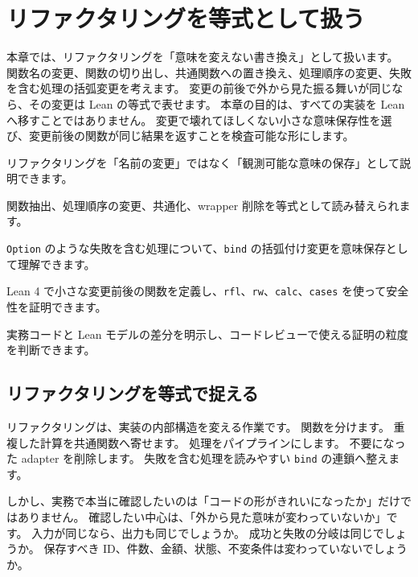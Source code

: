 \chapter{リファクタリングを等式として扱う}
\label{chap:ch34-refactoring-as-equations}

\begin{chapterabstract}
本章では、リファクタリングを「意味を変えない書き換え」として扱います。
関数名の変更、関数の切り出し、共通関数への置き換え、処理順序の変更、失敗を含む処理の括弧変更を考えます。
変更の前後で外から見た振る舞いが同じなら、その変更は Lean の等式で表せます。
本章の目的は、すべての実装を Lean へ移すことではありません。
変更で壊れてほしくない小さな意味保存性を選び、変更前後の関数が同じ結果を返すことを検査可能な形にします。
\end{chapterabstract}

\begin{learninggoals}
\item リファクタリングを「名前の変更」ではなく「観測可能な意味の保存」として説明できます。
\item 関数抽出、処理順序の変更、共通化、wrapper 削除を等式として読み替えられます。
\item \texttt{Option} のような失敗を含む処理について、\texttt{bind} の括弧付け変更を意味保存として理解できます。
\item Lean 4 で小さな変更前後の関数を定義し、\texttt{rfl}、\texttt{rw}、\texttt{calc}、\texttt{cases} を使って安全性を証明できます。
\item 実務コードと Lean モデルの差分を明示し、コードレビューで使える証明の粒度を判断できます。
\end{learninggoals}

\section{リファクタリングを等式で捉える}

リファクタリングは、実装の内部構造を変える作業です。
関数を分けます。
重複した計算を共通関数へ寄せます。
処理をパイプラインにします。
不要になった adapter を削除します。
失敗を含む処理を読みやすい \texttt{bind} の連鎖へ整えます。

しかし、実務で本当に確認したいのは「コードの形がきれいになったか」だけではありません。
確認したい中心は、「外から見た意味が変わっていないか」です。
入力が同じなら、出力も同じでしょうか。
成功と失敗の分岐は同じでしょうか。
保存すべき ID、件数、金額、状態、不変条件は変わっていないでしょうか。

